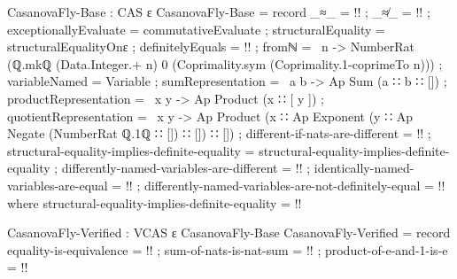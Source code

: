 \documentclass{report}
\begin{document}
\begin{code}
CasanovaFly-Base : CAS ε
CasanovaFly-Base = record
  { _≈_ = {!!}
  ; _≉_ = {!!}
  ; exceptionallyEvaluate = commutativeEvaluate
  ; structuralEquality = structuralEqualityOnε
  ; definitelyEquals = {!!}
  ; fromℕ = \ n ->
      NumberRat (ℚ.mkℚ (Data.Integer.+ n)
                       0
                       (Coprimality.sym (Coprimality.1-coprimeTo n)))
  ; variableNamed = Variable
  ; sumRepresentation = \ a b -> Ap Sum (a ∷ b ∷ [])
  ; productRepresentation = \ x y -> Ap Product (x ∷ [ y ])
  ; quotientRepresentation = \ x y ->
     Ap Product (x ∷ Ap Exponent (y ∷ Ap Negate (NumberRat ℚ.1ℚ ∷ []) ∷ []) ∷ [])
  ; different-if-nats-are-different = {!!}
  ; structural-equality-implies-definite-equality =
    structural-equality-implies-definite-equality
  ; differently-named-variables-are-different = {!!}
  ; identically-named-variables-are-equal = {!!}
  ; differently-named-variables-are-not-definitely-equal = {!!}
  }
  where
  structural-equality-implies-definite-equality =
    {!!}

CasanovaFly-Verified : VCAS ε CasanovaFly-Base
CasanovaFly-Verified = record
  { equality-is-equivalence = {!!}
  ; sum-of-nats-is-nat-sum = {!!}
  ; product-of-e-and-1-is-e = {!!}
  }
\end{code}
\end{document}
